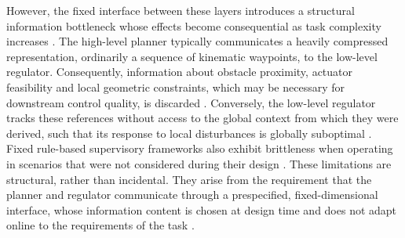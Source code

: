 \documentclass[12pt, a4paper]{article}
\begin{document}
However, the fixed interface between these layers introduces a structural information bottleneck whose effects become consequential as task complexity increases \parencite{kolchinsky_nonlinear_2019, li_hierarchical_2023, abdelmaksoud_control_2020}.
The high-level planner typically communicates a heavily compressed representation, ordinarily a sequence of kinematic waypoints, to the low-level regulator.
Consequently, information about obstacle proximity, actuator feasibility and local geometric constraints, which may be necessary for downstream control quality, is discarded \parencite{zhu_hierarchical_2024, zhou_two-level_2017, liu_adaptive_2013}.
Conversely, the low-level regulator tracks these references without access to the global context from which they were derived, such that its response to local disturbances is globally suboptimal \parencite{nguyen_identifying_2021, daoutidis_decomposition_2019}.
Fixed rule-based supervisory frameworks also exhibit brittleness when operating in scenarios that were not considered during their design \parencite{sadati_hierarchical_2008, dave_design_2023}.
These limitations are structural, rather than incidental.
They arise from the requirement that the planner and regulator communicate through a prespecified, fixed-dimensional interface, whose information content is chosen at design time and does not adapt online to the requirements of the task \parencite{kolchinsky_nonlinear_2019, zhang_multi-level_2015}.
 
\end{document}
